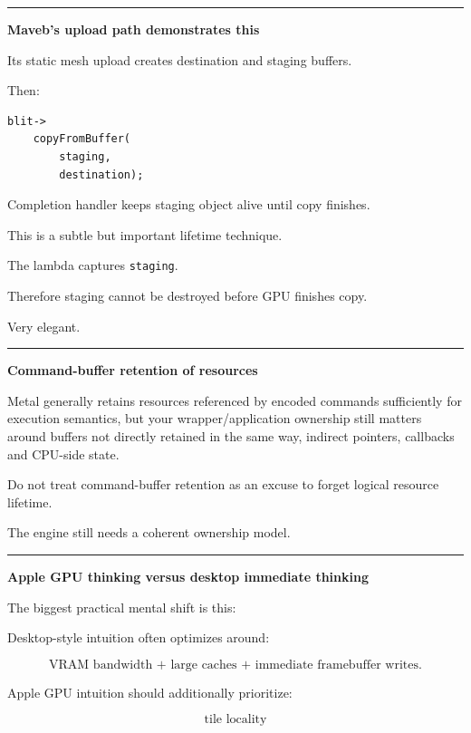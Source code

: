 \begin{center}\rule{0.5\linewidth}{0.5pt}\end{center}

\textbf{Maveb's upload path demonstrates this}

Its static mesh upload creates destination and staging buffers.

Then:

\begin{verbatim}
blit->
    copyFromBuffer(
        staging,
        destination);
\end{verbatim}

Completion handler keeps staging object alive until copy finishes.

This is a subtle but important lifetime technique.

The lambda captures \texttt{staging}.

Therefore staging cannot be destroyed before GPU finishes copy.

Very elegant.

\begin{center}\rule{0.5\linewidth}{0.5pt}\end{center}

\textbf{Command-buffer retention of resources}

Metal generally retains resources referenced by encoded commands sufficiently for execution semantics, but your wrapper/application ownership still matters around buffers not directly retained in the same way, indirect pointers, callbacks and CPU-side state.

Do not treat command-buffer retention as an excuse to forget logical resource lifetime.

The engine still needs a coherent ownership model.

\begin{center}\rule{0.5\linewidth}{0.5pt}\end{center}

\textbf{Apple GPU thinking versus desktop immediate thinking}

The biggest practical mental shift is this:

Desktop-style intuition often optimizes around:

\[
\boxed{
\text{VRAM bandwidth + large caches + immediate framebuffer writes}.
}
\]

Apple GPU intuition should additionally prioritize:

\[
\boxed{
\text{tile locality}
}
\]

